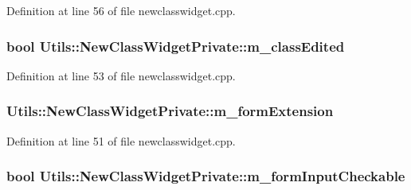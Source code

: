 Definition at line 56 of file newclasswidget.\-cpp.

\hypertarget{struct_utils_1_1_new_class_widget_private_ae5a992cfba229575b4392b57c4f07530}{
\subsubsection[{m\-\_\-class\-Edited}]{\setlength{\rightskip}{0pt plus 5cm}bool Utils\-::\-New\-Class\-Widget\-Private\-::m\-\_\-class\-Edited}}\label{struct_utils_1_1_new_class_widget_private_ae5a992cfba229575b4392b57c4f07530}


Definition at line 53 of file newclasswidget.\-cpp.

\hypertarget{struct_utils_1_1_new_class_widget_private_af5f72a25e0ff2277f00f79418b100604}{
\subsubsection[{m\-\_\-form\-Extension}]{ Utils\-::\-New\-Class\-Widget\-Private\-::m\-\_\-form\-Extension}}\label{struct_utils_1_1_new_class_widget_private_af5f72a25e0ff2277f00f79418b100604}


Definition at line 51 of file newclasswidget.\-cpp.

\hypertarget{struct_utils_1_1_new_class_widget_private_ab96a1a9b91703038e3475355d3cb42cf}{
\subsubsection[{m\-\_\-form\-Input\-Checkable}]{\setlength{\rightskip}{0pt plus 5cm}bool Utils\-::\-New\-Class\-Widget\-Private\-::m\-\_\-form\-Input\-Checkable}}\label{struct_utils_1_1_new_class_widget_private_ab96a1a9b91703038e3475355d3cb42cf}


